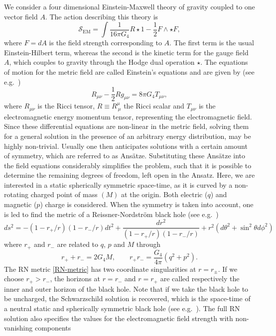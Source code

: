 \documentclass[12pt,twoside]{book}
\begin{document}
We consider a four dimensional Einstein-Maxwell theory of gravity coupled to one vector field $A$. The action describing this theory is
\begin{equation}\label{EM-Action}
\mathcal{S}_{\mathrm{EM}} = \int \frac{1}{16\pi G_{4}}R \star 1 - \frac{1}{2}F\wedge \star F,
\end{equation}
where $F = dA$ is the field strength corresponding to $A$.
The first term is the usual Einstein-Hilbert term, whereas the second is the kinetic term for the gauge field $A$, which couples to gravity through the Hodge dual operation $\star$.
The equations of motion for the metric field are called Einstein's equations and are given by (see e.g.\ \cite{bk:hobson})
\begin{equation}
R_{\mu\nu} - \frac{1}{2} R g_{\mu\nu} = 8 \pi G_{4} T_{\mu\nu},
\end{equation}
where $R_{\mu\nu}$ is the Ricci tensor, $R \equiv R^{\mu}_{\ \mu}$ the Ricci scalar and $T_{\mu\nu}$ is the electromagnetic energy momentum tensor, representing the electromagnetic field.
Since these differential equations are non-linear in the metric field, solving them for a general solution in the presence of an arbitrary energy distribution, may be highly non-trivial. Usually one then anticipates solutions with a certain amount of symmetry, which are referred to as Ans\"atze. Substituting these Ans\"atze into the field equations considerably simplifies the problem, such that it is possible to determine the remaining degrees of freedom, left open in the Ansatz. Here, we are interested in a static spherically symmetric space-time, as it is curved by a non-rotating charged point of mass $(M)$ at the origin. Both electric ($q$) and magnetic ($p$) charge is considered. When the symmetry is taken into account, one is led to find the metric of a Reissner-Nordstr\"om black hole (see e.g.\ \cite{bk:hobson})
\begin{equation}\label{RN-metric}
ds^{2} =  -\left(1-r_{+}/r\right) \left(1-r_{-}/r\right) dt^{2} + \frac{dr^{2}}{(1-r_{+}/r)(1-r_{-}/r)}
+ r^{2}(d\theta^{2}+\sin^{2}\theta d\phi^{2})
\end{equation}where $r_{+}$ and $r_{-}$ are related to $q$, $p$ and $M$ through
\begin{equation}\label{relationHor}
r_{+}+r_{-} = 2G_{4}M,\qquad
r_{+}r_{-}=\frac{G_{4}}{4\pi}\left(q^{2}+p^{2}\right).
\end{equation}
The RN metric \eqref{RN-metric} has two coordinate singularities at $r=r_{\pm}$. If we choose $r_{+}>r_{-}$, the horizons at $r=r_{-}$ and $r=r_{+}$ are called respectively the inner and outer horizon of the black hole. Note that if we take the black hole to be uncharged, the Schwarzschild solution is recovered, which is the space-time of a neutral static and spherically symmetric black hole (see e.g.\ \cite{bk:hobson}). The full RN solution also specifies the values for the electromagnetic field strength with non-vanishing components
\end{document}
